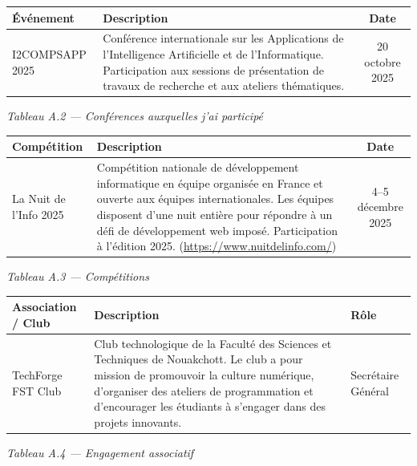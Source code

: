﻿\documentclass[12pt,a4paper]{report}
\begin{document}
\medskip
{}
\medskip

\begin{center}
\begin{tabularx}{\textwidth}{|l|X|c|}
\hline
\textbf{Événement} & \textbf{Description} & \textbf{Date} \\
\hline
I2COMPSAPP 2025 &
Conférence internationale sur les Applications de l'Intelligence Artificielle et de l'Informatique.
Participation aux sessions de présentation de travaux de recherche et aux ateliers thématiques. &
20 octobre 2025 \\
\hline
\end{tabularx}

\smallskip
{\small\textit{Tableau A.2 --- Conférences auxquelles j'ai participé}}
\end{center}

\medskip
{}
\medskip

\begin{center}
\begin{tabularx}{\textwidth}{|l|X|c|}
\hline
\textbf{Compétition} & \textbf{Description} & \textbf{Date} \\
\hline
La Nuit de l'Info 2025 &
Compétition nationale de développement informatique en équipe organisée en France et ouverte aux
équipes internationales. Les équipes disposent d'une nuit entière pour répondre à un défi de
développement web imposé. Participation à l'édition 2025.
(\url{https://www.nuitdelinfo.com/}) &
4--5 décembre 2025 \\
\hline
\end{tabularx}

\smallskip
{\small\textit{Tableau A.3 --- Compétitions}}
\end{center}

\medskip
{}
\medskip

\begin{center}
\begin{tabularx}{\textwidth}{|l|X|l|}
\hline
\textbf{Association / Club} & \textbf{Description} & \textbf{Rôle} \\
\hline
TechForge FST Club &
Club technologique de la Faculté des Sciences et Techniques de Nouakchott. Le club a pour mission
de promouvoir la culture numérique, d'organiser des ateliers de programmation et d'encourager les
étudiants à s'engager dans des projets innovants. &
Secrétaire Général \\
\hline
\end{tabularx}

\smallskip
{\small\textit{Tableau A.4 --- Engagement associatif}}
\end{center}
\end{document}

